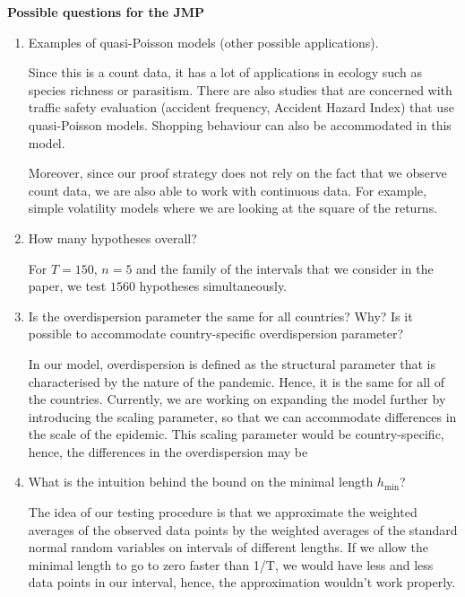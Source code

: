 \documentclass[a4paper,12pt]{article}
\numberwithin{equation}{section}
\begin{document}
\begin{center}
	\Large\textbf{Possible questions for the JMP}
\end{center}

\begin{enumerate}
	\item Examples of quasi-Poisson models (other possible applications).
	
	Since this is a count data, it has a lot of applications in ecology such as species richness or parasitism. There are also studies that are concerned with traffic safety evaluation (accident frequency, Accident Hazard Index) that use quasi-Poisson models. Shopping behaviour can also be accommodated in this model.
	
	Moreover, since our proof strategy does not rely on the fact that we observe count data, we are also able to work with continuous data. For example, simple volatility models where we are looking at the square of the returns.

\item How many hypotheses overall?
	
	For $T = 150$, $n = 5$ and the family of the intervals that we consider in the paper, we test $1560$ hypotheses simultaneously.

\item Is the overdispersion parameter the same for all countries? Why? Is it possible to accommodate country-specific overdispersion parameter?
	
	In our model, overdispersion is defined as the structural parameter that is characterised by the nature of the pandemic. Hence, it is the same for all of the countries. Currently, we are working on expanding the model further by introducing the scaling parameter, so that we can accommodate differences in the scale of the epidemic. This scaling parameter would be country-specific, hence, the differences in the overdispersion may be 

\item What is the intuition behind the bound on the minimal length $h_{\text{min}}$?

	The idea of our testing procedure is that we approximate the weighted averages of the observed data points by the weighted averages of the standard normal random variables on intervals of different lengths. If we allow the minimal length to go to zero faster than 1/T, we would have less and less data points in our interval, hence, the approximation wouldn't work properly.


\end{enumerate}
\end{document}
